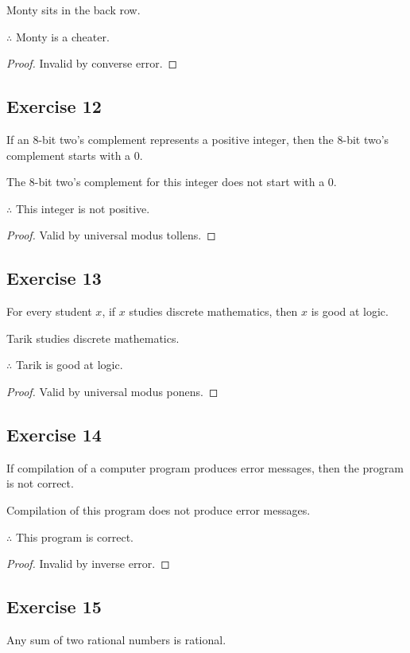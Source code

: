 \documentclass[14pt]{extarticle}
\begin{document}
Monty sits in the back row.

$\therefore$ Monty is a cheater.

\begin{proof}
Invalid by converse error.
\end{proof}

\subsection{Exercise 12}
If an 8-bit two’s complement represents a positive integer, then the 8-bit two’s complement starts with a 0.

The 8-bit two’s complement for this integer does not start with a 0.

$\therefore$ This integer is not positive.

\begin{proof}
Valid by universal modus tollens.
\end{proof}

\subsection{Exercise 13}
For every student $x$, if $x$ studies discrete mathematics, then $x$ is good at logic.

Tarik studies discrete mathematics.

$\therefore$ Tarik is good at logic.

\begin{proof}
Valid by universal modus ponens.
\end{proof}

\subsection{Exercise 14}
If compilation of a computer program produces error messages, then the program is not correct.

Compilation of this program does not produce error messages.

$\therefore$ This program is correct.

\begin{proof}
Invalid by inverse error.
\end{proof}

\subsection{Exercise 15}
Any sum of two rational numbers is rational.
\end{document}
